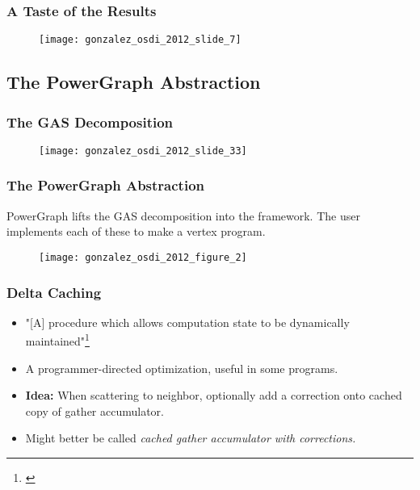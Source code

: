 \begin{frame}
  \frametitle{A Taste of the Results}
  \begin{figure}
    \centering
    \texttt{[image: gonzalez\_osdi\_2012\_slide\_7]}
    \caption{\cite[OSDI '12 Slides]{gonzalez2012powergraph-slides}}
  \end{figure}
\end{frame}


\subsection{The PowerGraph Abstraction}

\begin{frame}
  \frametitle{The GAS Decomposition}
  \begin{figure}
    \centering
    \texttt{[image: gonzalez\_osdi\_2012\_slide\_33]}
    \caption{\cite[OSDI '12 Slides]{gonzalez2012powergraph-slides}}
  \end{figure}
\end{frame}

\begin{frame}
  \frametitle{The PowerGraph Abstraction}
  PowerGraph lifts the GAS decomposition into the framework. The user implements
  each of these to make a vertex program.
  \begin{figure}
    \centering
    \texttt{[image: gonzalez\_osdi\_2012\_figure\_2]}
    \caption{\cite[OSDI '12]{gonzalez2012powergraph}}
  \end{figure}
\end{frame}

\begin{frame}
  \frametitle{Delta Caching}
  \begin{itemize}
    \item "[A] procedure which allows computation state to be dynamically
          maintained"\footnote{\cite[OSDI '12]{gonzalez2012powergraph}}
    \item A programmer-directed optimization, useful in some programs.
    \item \textbf{Idea:} When scattering to neighbor, optionally add a
          correction onto cached copy of gather accumulator.
    \item Might better be called \textit{cached gather accumulator with
          corrections.}
  \end{itemize}
\end{frame}

